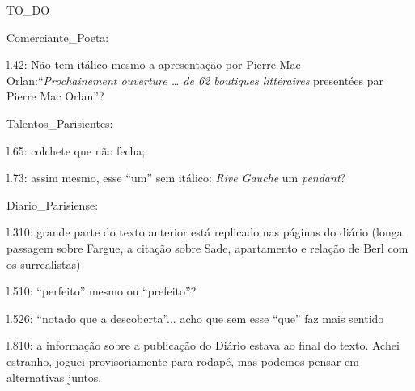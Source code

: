 TO_DO


Comerciante_Poeta:

l.42: Não tem itálico mesmo a apresentação por Pierre Mac Orlan:``\emph{Prochainement ouverture \ldots{} de 62 boutiques littéraires} presentées par Pierre Mac Orlan''?

Talentos_Parisientes:

l.65: colchete que não fecha;

l.73: assim mesmo, esse ``um'' sem itálico: \emph{Rive Gauche} um \emph{pendant}?

Diario_Parisiense:

l.310: grande parte do texto anterior está replicado nas páginas do diário (longa passagem sobre Fargue, a citação sobre Sade, apartamento e relação de Berl com os surrealistas)

l.510: ``perfeito'' mesmo ou ``prefeito''?

l.526: ``notado que a descoberta''... acho que sem esse ``que'' faz mais sentido

l.810: a informação sobre a publicação do Diário estava ao final do texto. Achei estranho, joguei provisoriamente para rodapé, mas podemos pensar em alternativas juntos.